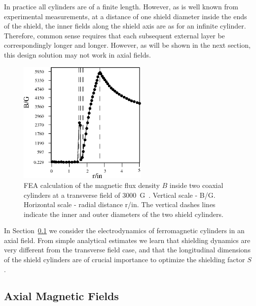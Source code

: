 \documentclass[12pt]{article}
\begin{document}
In practice all cylinders are of a finite length. However, as is well known from 
experimental measurements, at a distance of one shield diameter inside the ends 
of the shield, the inner fields along the shield axis are as for an infinite cylinder. 
Therefore, common sense requires that each subsequent external layer be 
correspondingly longer and longer. However, as will be shown in the next section, 
this design solution may not work in axial fields.

\begin{figure}[htbp]
\centering
\includegraphics[height=6cm]{Grilli-copy.eps}
\caption{FEA calculation of the magnetic flux density $B$ inside two coaxial 
cylinders at a transverse field of 3000~G~\cite{grilli}. Vertical scale - B/G. 
Horizontal scale - radial distance r/in. The vertical dashes lines indicate the
inner and outer diameters of the two shield cylinders.}
\label{shieldGrilli}
\end{figure}

In Section~\ref{sec:ednmics} we consider the electrodynamics of ferromagnetic 
cylinders in an axial field. From simple analytical estimates we learn that 
shielding dynamics are very different from the transverse field case, and that 
the longitudinal dimensions of the shield cylinders are of crucial importance to 
optimize the shielding factor $S$. 

\subsection{Axial Magnetic Fields}
\label{sec:ednmics}
\end{document}
